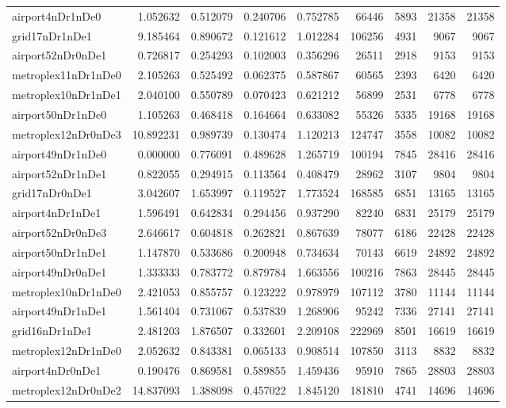 \begin{longtable}{|l|r|r|r|r|r|r|r|r|}
airport4nDr1nDe0 & 1.052632 & 0.512079 & 0.240706 & 0.752785 & 66446 & 5893 & 21358 & 21358 \\
grid17nDr1nDe1 & 9.185464 & 0.890672 & 0.121612 & 1.012284 & 106256 & 4931 & 9067 & 9067 \\
airport52nDr0nDe1 & 0.726817 & 0.254293 & 0.102003 & 0.356296 & 26511 & 2918 & 9153 & 9153 \\
metroplex11nDr1nDe0 & 2.105263 & 0.525492 & 0.062375 & 0.587867 & 60565 & 2393 & 6420 & 6420 \\
metroplex10nDr1nDe1 & 2.040100 & 0.550789 & 0.070423 & 0.621212 & 56899 & 2531 & 6778 & 6778 \\
airport50nDr1nDe0 & 1.105263 & 0.468418 & 0.164664 & 0.633082 & 55326 & 5335 & 19168 & 19168 \\
metroplex12nDr0nDe3 & 10.892231 & 0.989739 & 0.130474 & 1.120213 & 124747 & 3558 & 10082 & 10082 \\
airport49nDr1nDe0 & 0.000000 & 0.776091 & 0.489628 & 1.265719 & 100194 & 7845 & 28416 & 28416 \\
airport52nDr1nDe1 & 0.822055 & 0.294915 & 0.113564 & 0.408479 & 28962 & 3107 & 9804 & 9804 \\
grid17nDr0nDe1 & 3.042607 & 1.653997 & 0.119527 & 1.773524 & 168585 & 6851 & 13165 & 13165 \\
airport4nDr1nDe1 & 1.596491 & 0.642834 & 0.294456 & 0.937290 & 82240 & 6831 & 25179 & 25179 \\
airport52nDr0nDe3 & 2.646617 & 0.604818 & 0.262821 & 0.867639 & 78077 & 6186 & 22428 & 22428 \\
airport50nDr1nDe1 & 1.147870 & 0.533686 & 0.200948 & 0.734634 & 70143 & 6619 & 24892 & 24892 \\
airport49nDr0nDe1 & 1.333333 & 0.783772 & 0.879784 & 1.663556 & 100216 & 7863 & 28445 & 28445 \\
metroplex10nDr1nDe0 & 2.421053 & 0.855757 & 0.123222 & 0.978979 & 107112 & 3780 & 11144 & 11144 \\
airport49nDr1nDe1 & 1.561404 & 0.731067 & 0.537839 & 1.268906 & 95242 & 7336 & 27141 & 27141 \\
grid16nDr1nDe1 & 2.481203 & 1.876507 & 0.332601 & 2.209108 & 222969 & 8501 & 16619 & 16619 \\
metroplex12nDr1nDe0 & 2.052632 & 0.843381 & 0.065133 & 0.908514 & 107850 & 3113 & 8832 & 8832 \\
airport4nDr0nDe1 & 0.190476 & 0.869581 & 0.589855 & 1.459436 & 95910 & 7865 & 28803 & 28803 \\
metroplex12nDr0nDe2 & 14.837093 & 1.388098 & 0.457022 & 1.845120 & 181810 & 4741 & 14696 & 14696 \\

\end{longtable}
